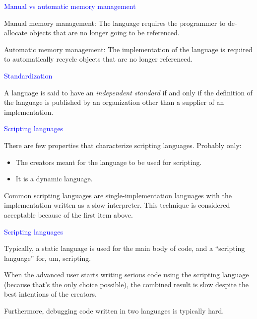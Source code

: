 \documentclass{slides}
\newcommand{\ti}[1]{\begin{center}\Large{\textcolor{blue}{#1}}\end{center}}
\begin{document}
\begin{slide}\ti{Manual vs automatic memory management}

Manual memory management: The language requires the programmer to
de-allocate objects that are no longer going to be referenced.

Automatic memory management: The implementation of the language is
required to automatically recycle objects that are no longer
referenced.

\vfill\end{slide}
\begin{slide}\ti{Standardization}

A language is said to have an \emph{independent standard} if and only
if the definition of the language is published by an organization
other than a supplier of an implementation.

\vfill\end{slide}
\begin{slide}\ti{Scripting languages}

There are few properties that characterize scripting languages.
Probably only:

\begin{itemize}
\item The creators meant for the language to be used for scripting.
\item It is a dynamic language.
\end{itemize}

Common scripting languages are single-implementation languages with
the implementation written as a slow interpreter.  This technique is
considered acceptable because of the first item above.

\vfill\end{slide}
\begin{slide}\ti{Scripting languages}

Typically, a static language is used for the main body of code, and a
``scripting language'' for, um, scripting.

When the advanced user starts writing serious code using the scripting
language (because that's the only choice possible), the combined
result is slow despite the best intentions of the creators.

Furthermore, debugging code written in two languages is typically hard.

\vfill\end{slide}
\end{document}
